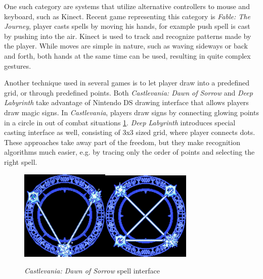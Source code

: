 One such category are systems that utilize alternative controllers to mouse and keyboard, such as Kinect. Recent game representing this category is \emph{Fable: The Journey}, player casts spells by moving his hands, for example push spell is cast by pushing into the air. Kinect is used to track and recognize patterns made by the player. While moves are simple in nature, such as waving sideways or back and forth, both hands at the same time can be used, resulting in quite complex gestures.

Another technique used in several games is to let player draw into a predefined grid, or through predefined points. Both \emph{Castlevania: Dawn of Sorrow} and \emph{Deep Labyrinth} take advantage of Nintendo DS drawing interface that allows players draw magic signs. In \emph{Castlevania}, players draw signs by connecting glowing points in a circle in out of combat situations \ref{fig:castlevania}. \emph{Deep Labyrinth} introduces special casting interface as well, consisting of 3x3 sized grid, where player connects dots. These approaches take away part of the freedom, but they make recognition algorithms much easier, e.g. by tracing only the order of points and selecting the right spell.

\begin{figure}[!htb]
\begin{center}
\label{fig:castlevania}
\includegraphics[width=.3\linewidth]{ext/castlevania.png}\quad\includegraphics[width=.3\linewidth]{ext/castlevania2.png}
\end{center}
	\centering
	\caption{\emph{Castlevania: Dawn of Sorrow} spell interface}
\end{figure}

